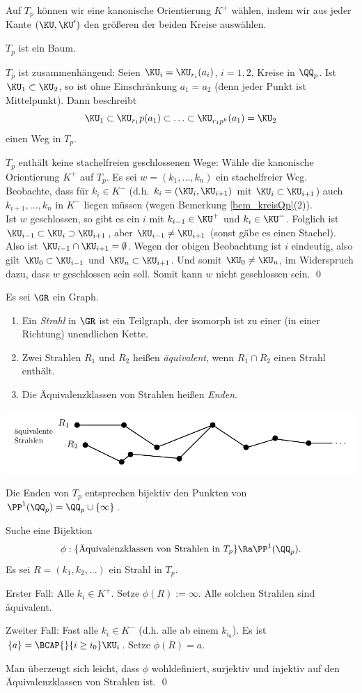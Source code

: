 Auf $T_p$ können wir eine kanonische Orientierung $K^+$ wählen,
indem wir aus jeder Kante $(\KU,\KU')$ den größeren der beiden Kreise
auswählen.

\BEM $T_p$ ist ein Baum.

\bew $T_p$ ist zusammenhängend: Seien $\KU_i=\KU_{r_i}(a_i)$, $i=1,2$,
Kreise in $\QQ_p$. Ist $\KU_1\subset \KU_2$, so ist ohne Einschränkung
$a_1=a_2$ (denn jeder Punkt ist Mittelpunkt). Dann beschreibt
\[
\KU_1 \subset \KU_{r_1}p(a_1) \subset \ldots \subset
\KU_{r_1 p^k}(a_1)=\KU_2
\]
einen Weg in $T_p$.

$T_p$ enthält keine stachelfreien geschlossenen Wege: Wähle die
kanonische Orientierung $K^+$ auf $T_p$.
Es sei $w=(k_1,\ldots,k_n)$ ein stachelfreier Weg.
Beobachte, dass für $k_i\in K^-$ (d.h. $k_i=(\KU_i,\KU_{i+1})$
mit $\KU_i\subset \KU_{i+1}$) auch $k_{i+1},\ldots,k_n$ in $K^-$
liegen müssen (wegen Bemerkung \ref{bem_kreisQp}(2)).\\
Ist $w$ geschlossen, so gibt es ein $i$ mit $k_{i-1}\in\KU^+$ und
$k_i\in\KU^-$.
Folglich ist $\KU_{i-1}\subset \KU_i \supset \KU_{i+1}$, aber
$\KU_{i-1}\neq\KU_{i+1}$ (sonst gäbe es einen Stachel).
Also ist $\KU_{i-1}\cap \KU_{i+1}=\emptyset$. Wegen der obigen
Beobachtung ist $i$ eindeutig, also gilt
$\KU_0\subset \KU_{i-1}$ und $\KU_n\subset \KU_{i+1}$.
Und somit $\KU_0\neq \KU_n$, im Widerspruch dazu, dass $w$ geschlossen
sein soll. Somit kann $w$ nicht geschlossen sein.
\qed

\DEF Es sei $\GR$ ein Graph.
\begin{enumerate}
\item Ein \emph{Strahl} in $\GR$ ist ein Teilgraph,
der isomorph ist zu einer (in einer Richtung) unendlichen Kette.
\item Zwei Strahlen $R_1$ und $R_2$ heißen \emph{äquivalent},
wenn $R_1\cap R_2$ einen Strahl enthält.
\item Die Äquivalenzklassen von Strahlen heißen \emph{Enden}.
\end{enumerate}
\begin{center}
	\includegraphics{grugraImages/R1R2}
\end{center}

\PROP Die Enden von $T_p$ entsprechen bijektiv den Punkten von
$\PP^1(\QQ_p)=\QQ_p\cup\{\infty\}$.

\bew Suche eine Bijektion
\[
\phi:\{\text{Äquivalenzklassen von Strahlen in $T_p$}\}
\Ra \PP^1(\QQ_p).
\]
Es sei $R=(k_1,k_2,\ldots)$ ein Strahl in $T_p$.

Erster Fall: Alle $k_i\in K^+$. Setze $\phi(R):=\infty$.
Alle solchen Strahlen sind äquivalent.

Zweiter Fall: Fast alle $k_i\in K^-$ (d.h. alle ab einem $k_{i_0}$).
Es ist $\{a\}=\BCAP{}{i\geq i_0} \KU_i$.
Setze $\phi(R)=a$.

Man überzeugt sich leicht, dass $\phi$ wohldefiniert, surjektiv und
injektiv auf den Äquivalenzklassen von Strahlen ist.
\qed